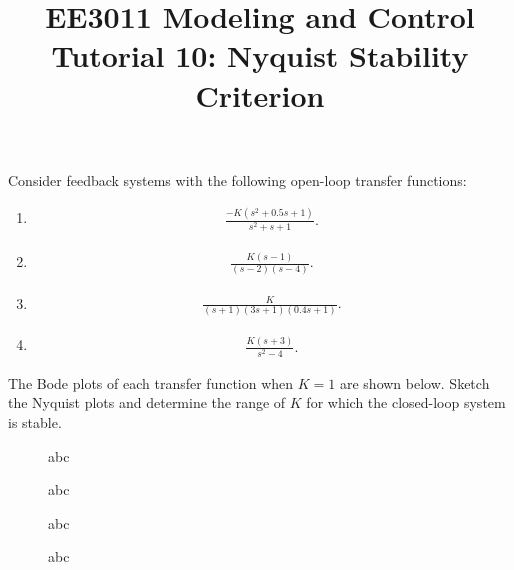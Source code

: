 \documentclass{article}
\title{EE3011 Modeling and Control\\Tutorial 10: Nyquist Stability Criterion}
\date{}
\newcommand{\tikzdir}[1]{tikz/#1.tikz}
\newcommand{\inputtikz}[1]{}}
\begin{document}
 \maketitle
Consider feedback systems with the following open-loop transfer functions:
\begin{enumerate}
\item \begin{align*}
        \frac{-K(s^2+0.5s+1)}{s^2+s+1}.
      \end{align*}

\item \begin{align*}
        \frac{K(s-1)}{(s-2)(s-4)}.
      \end{align*}
\item \begin{align*}
        \frac{K}{(s+1)(3s+1)(0.4s+1)}.
      \end{align*}
\item \begin{align*}
        \frac{K(s+3)}{s^2-4}.
      \end{align*}
\end{enumerate}


The Bode plots of each transfer function when $K = 1$ are shown below. Sketch the Nyquist plots and determine the range of $K$ for which the closed-loop system is stable.


  \begin{figure}[h]
    \centering
    \inputtikz{Tut101}
    \caption{abc}
  \end{figure}

  \begin{figure}[h]
    \centering
    \inputtikz{Tut102}
    \caption{abc}
  \end{figure}
  \begin{figure}[h]
    \centering
    \inputtikz{Tut103}
    \caption{abc}
  \end{figure}
  \begin{figure}[h]
    \centering
    \inputtikz{Tut104}
    \caption{abc}
  \end{figure}
\end{document}
